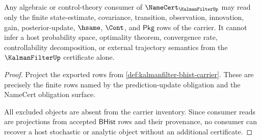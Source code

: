 \begin{theorem}
\label{thm:kalmanfilter-downstream-consumer-boundary}
Any algebraic or control-theory consumer of $\NameCert_{\KalmanFilterUp}$ may read only the finite state-estimate, covariance, transition, observation, innovation, gain, posterior-update, $\hsame$, $\Cont$, and $\mathsf{Pkg}$ rows of the carrier. It cannot infer a host probability space, optimality theorem, convergence rate, controllability decomposition, or external trajectory semantics from the $\KalmanFilterUp$ certificate alone.
\end{theorem}
\begin{proof}
Project the exported rows from \autoref{def:kalmanfilter-bhist-carrier}. These are precisely the finite rows named by the prediction-update obligation and the NameCert obligation surface.

All excluded objects are absent from the carrier inventory. Since consumer reads are projections from accepted $\mathsf{BHist}$ rows and their provenance, no consumer can recover a host stochastic or analytic object without an additional certificate.
\end{proof}

